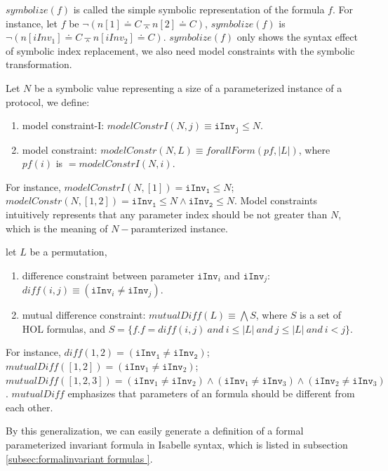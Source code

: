 \documentclass{llncs}
\def \eqc {\doteq }
\def \andc {\barwedge }
\def \iInv {iInv}
\begin{document}
$symbolize(f)$ is called the simple symbolic representation of the formula $f$. For instance, let $f$ be $\neg (n[1]\eqc C \andc n[2]\eqc C)$,   $symbolize(f )$ is $\neg (n[\iInv_1]\eqc C \andc n[iInv_2]\eqc C)$.   $symbolize(f )$ only shows the syntax effect of symbolic index replacement, we also need  model constraints with the symbolic transformation.

\begin{definition}
Let $N$ be a symbolic value representing a size of a parameterized instance of a protocol,   we define:
\begin{enumerate}
\item model constraint-I: $modelConstrI(N,j) \equiv \mathtt{iInv_j} \le N$.
\item model constraint: $modelConstr(N,L) \equiv forallForm(pf,|L|)$, where $pf(i)$ is $=modelConstrI(N ,i)$.
\end{enumerate}
\end{definition}

For instance, $modelConstrI(N,  [1])=\mathtt{iInv_1} \le N$; $modelConstr(N, [1,2])=\mathtt{iInv_1} \le N \wedge \mathtt{iInv_2} \le N$.  Model constraints intuitively represents that any parameter index should be not greater than $N$, which is the  meaning of $N-$paramterized instance.

\begin{definition}
let $L$ be a permutation,
\begin{enumerate}
\item difference constraint between parameter $\mathtt{iInv}_i$ and $\mathtt{iInv}_j$: $diff(i,j) \equiv (\mathtt{iInv}_i \ne \mathtt{iInv}_j)$.
\item mutual difference constraint: $mutualDiff(L) \equiv \bigwedge S$, where $S$ is a set of HOL formulas, and $S=\{f. f=diff(i,j)~ and~ i\le |L| ~and~ j \le |L|~ and ~i < j\}$.
\end{enumerate}
\end{definition}
For instance, $diff(  1,2)= (\mathtt{\iInv_1} \ne \mathtt{\iInv_2})$; $mutualDiff( [1,2])=  (\mathtt{iInv}_1 \ne \mathtt{ iInv}_2)$; $mutualDiff( [1,2,3])= (\mathtt{iInv}_1 \ne \mathtt{iInv}_2) \wedge   (\mathtt{iInv}_1 \ne \mathtt{iInv}_3) \wedge   (\mathtt{iInv}_2 \ne \mathtt{iInv}_3)$. $mutualDiff$ emphasizes that  parameters of an formula   should be different from each other.

By this generalization, we can easily generate a definition of a formal parameterized invariant formula in Isabelle syntax, which is listed in subsection \ref{subsec:formalinvariant formulas }.
\end{document}
